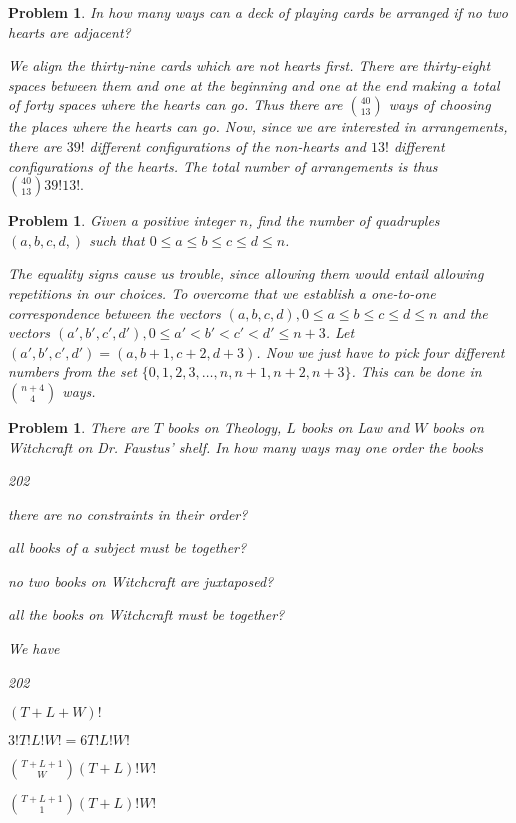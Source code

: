 \documentclass[11pt, openany]{book}
\theoremstyle{change} \theoremheaderfont{\blue\sffamily\bfseries}
\newtheorem{pro}[thm]{Problem}
\theoremstyle{nonumberplain} \theoremheaderfont{\sffamily\bfseries}
\def\binom#1#2{{#1\choose#2}}
\newcommand{\dis}{\displaystyle}
\newcommand{\í}{\'{\i}}
\begin{document}
\begin{multicols}{2}
\begin{pro} In how many ways can a deck of playing cards be
arranged if no two hearts are adjacent?\begin{answer} We align the
thirty-nine cards which are not hearts first. There are thirty-eight
spaces between them and one at the beginning and one at the end
making a total of forty spaces where the hearts can go. Thus there
are $\binom{40}{13}$ ways of choosing the {\em places} where the
hearts can go. Now, since we are interested in arrangements, there
are $39!$ different configurations of the non-hearts and $13!$
different configurations of the hearts. The total number of
arrangements is thus $\binom{40}{13}39!13!.$
\end{answer}
\end{pro}
\begin{pro} Given a positive integer $n$, find the number of quadruples $(a,
b, c, d,)$ such that $ 0 \leq a \leq b \leq c \leq d \leq n$.
\begin{answer} The equality signs cause us trouble, since allowing them
would entail allowing repetitions in our choices. To overcome that
we establish a one-to-one  correspondence between the vectors $(a,
b, c, d), 0 \leq a \leq b \leq c \leq d \leq n$ and the vectors
$(a', b', c', d'), 0 \leq a' < b' < c' < d' \leq n + 3$. Let $(a',
b', c', d') = (a, b + 1, c + 2, d + 3)$. Now we just have to pick
four different numbers from the set $\{ 0, 1, 2, 3, \ldots , n, n +
1, n + 2, n + 3\}$. This can be done in $\binom{n + 4}{4}$ ways.
\end{answer}
\end{pro}


\begin{pro}There are $T$ books on Theology, $L$ books on Law and $W$
books on Witchcraft on Dr. Faustus' shelf. In how many ways may one
order the books
\begin{dingautolist}{202}
\item there are no constraints in their order? \item all books of
a subject must be together? \item no two books on Witchcraft are
juxtaposed? \item all the books on Witchcraft must be together?
\end{dingautolist}
\begin{answer}We have\begin{dingautolist}{202} \item $(T + L + W)!$ \item $3!T!L!W!
= 6T!L!W!$ \item $\dis{\binom{T + L + 1}{W}(T+L)!W!}$
\item $\dis{\binom{T + L + 1}{1}(T+L)!W!}$
\end{dingautolist}
\end{answer}
\end{pro}



\end{multicols}
\end{document}
